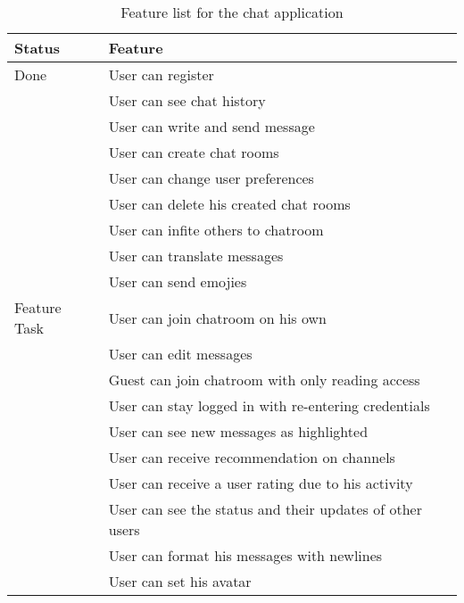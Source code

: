 \documentclass[]{scrartcl}
\begin{document}
\noindent
\renewcommand{\arraystretch}{1.5}
\begin{table}
    \begin{tabularx}{\textwidth}{XX}
        \textbf{Status} & \textbf{Feature} \\\hline
        Done & User can register \\
             & User can see chat history \\
             & User can write and send message \\
             & User can create chat rooms \\
             & User can change user preferences \\
             & User can delete his created chat rooms \\
             & User can infite others to chatroom \\
             & User can translate messages \\
             & User can send emojies \\\hline\hline
         Feature Task
             & User can join chatroom on his own \\
             & User can edit messages \\
             & Guest can join chatroom with only reading access \\
             & User can stay logged in with re-entering credentials \\
             & User can see new messages as highlighted \\
             & User can receive recommendation on channels \\
             & User can receive a user rating due to his activity \\
             & User can see the status and their updates of other users \\
             & User can format his messages with newlines \\
             & User can set his avatar
    \end{tabularx}\caption{Feature list for the chat application}\label{fig:feature-list}
\end{table}
\end{document}
